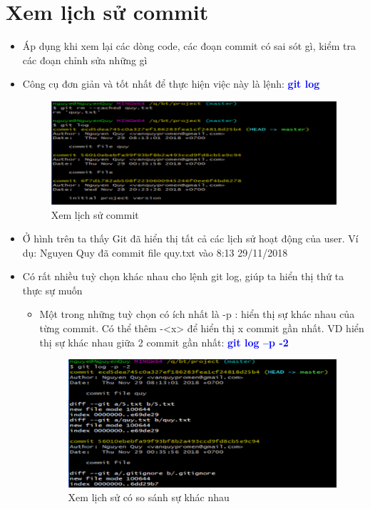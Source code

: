 \documentclass[12pt,a4paper]{report}
\begin{document}
\section{Xem lịch sử commit}
\begin{itemize}
\item Áp dụng khi xem lại các dòng code, các đoạn commit có sai sót gì, kiểm tra các đoạn chỉnh sửa những gì\vskip 0.4cm
\item Công cụ đơn giản và tốt nhất để thực hiện việc này là lệnh: \textcolor{blue}{\bf git log}

\begin{figure}[!ht]
	\centering
	\includegraphics[width=0.8\linewidth]{screenshot017}
\caption{Xem lịch sử commit}
	\label{fig:screenshot017}
\end{figure}

\item Ở hình trên ta thấy Git đã hiển thị tất cả các lịch sử hoạt động của user. Ví dụ: Nguyen Quy đã commit file quy.txt vào 8:13 29/11/2018\vskip 0.4cm
\item Có rất nhiều tuỳ chọn khác nhau cho lệnh git log, giúp ta hiển thị thứ ta thực sự muốn
	\begin{itemize}
		\item Một trong những tuỳ chọn có ích nhất là -p : hiển thị sự khác nhau của từng commit. Có thể thêm -<x> để hiển thị x commit gần nhất. VD hiển thị sự khác nhau giữa 2 commit gần nhất: \textcolor{blue}{\bf git log –p -2}

\begin{figure}[!ht]
	\centering
	\includegraphics[width=0.8\linewidth]{screenshot018}
	\caption{Xem lịch sử có so sánh sự khác nhau}
	\label{fig:screenshot018}
\end{figure}


\end{itemize}
\end{itemize}
\end{document}
